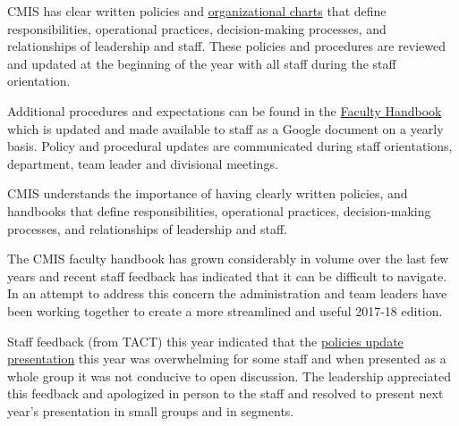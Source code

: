 

\begin{findings}
CMIS has clear written policies and \href{https://drive.google.com/a/cmis.ac.th/file/d/0Bwny3HLdIIS7RF9veFk5UXB2Q2M/view?usp=sharing}{organizational charts} that define responsibilities, operational practices, decision-making processes, and relationships of leadership and staff. These policies and procedures are reviewed and updated at the beginning of the year with all staff during the staff orientation.

Additional procedures and expectations can be found in the \href{https://docs.google.com/a/cmis.ac.th/document/d/1DrXVXsgw4U62HCGOceOKsgC8V1LDQFhHKgDB35oq4wY/edit?usp=sharing}{Faculty Handbook} which is updated and made available to staff as a Google document on a yearly basis. Policy and procedural updates are communicated during staff orientations, department, team leader and divisional meetings.


CMIS understands the importance of having clearly written policies, and handbooks that define responsibilities, operational practices, decision-making processes, and relationships of leadership and staff. 

The CMIS faculty handbook has grown considerably in volume over the last few years and recent staff feedback has indicated that it can be difficult to navigate. In an attempt to address this concern the administration and team leaders have been working together to create a more streamlined and useful  2017-18 edition. 

Staff feedback (from TACT) this year indicated that the \href{https://docs.google.com/a/cmis.ac.th/presentation/d/18ekiAcUSiwa7oJM9tdwe2OSfnC_47RkbLz8ZjEt6O9I/edit?usp=sharing}{policies update presentation} this year was overwhelming for some staff and when presented as a whole group it was not conducive to open discussion. The leadership appreciated this feedback and apologized in person to the staff and resolved to present next year's presentation in small groups and in segments. 
\end{findings}

